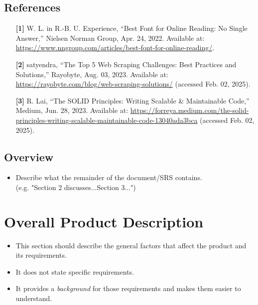 \documentclass[]{article}
\begin{document}
\subsection{References}
\label{sub:references}
\begin{enumerate}
    \item [\textbf{[1]}] W. L. in R.-B. U. Experience, “Best Font for Online Reading: No Single Answer,” Nielsen Norman Group, Apr. 24, 2022. Available at: \url{https://www.nngroup.com/articles/best-font-for-online-reading/}.
    
    \item [\textbf{[2]}] satyendra, “The Top 5 Web Scraping Challenges: Best Practices and Solutions,” Rayobyte, Aug. 03, 2023. Available at: \url{https://rayobyte.com/blog/web-scraping-solutions/} (accessed Feb. 02, 2025).
    
    \item [\textbf{[3]}] R. Lai, “The SOLID Principles: Writing Scalable \& Maintainable Code,” Medium, Jun. 28, 2023. Available at: \url{https://forreya.medium.com/the-solid-principles-writing-scalable-maintainable-code-13040ada3bca} (accessed Feb. 02, 2025).
\end{enumerate}

\subsection{Overview}
\label{sub:overview}
\begin{itemize}
	\item Describe what the remainder of the document/SRS contains.\\
	(e.g. "Section 2 discusses...Section 3...")
\end{itemize}


\section{Overall Product Description}
\label{sec:overall_description}

\begin{itemize}
	\item This section should describe the general factors that affect the product and its requirements. 
	\item It does not state specific requirements.
	\item It provides a \emph{background} for those requirements and makes them easier to understand.
\end{itemize}
\end{document}
